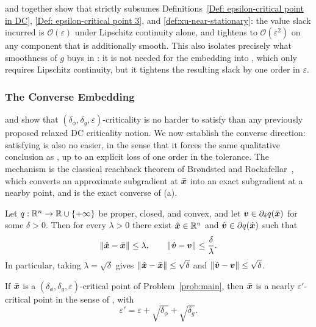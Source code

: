  and
 together show that
 strictly subsumes
Definitions~\ref{Def: epsilon-critical point in DC},
\ref{Def: epsilon-critical point 3}, and \ref{def:xu-near-stationary}: the
value slack incurred is $\mathcal O(\varepsilon)$ under Lipschitz
continuity alone, and tightens to $\mathcal O(\varepsilon^2)$ on any
component that is additionally smooth. This also isolates precisely what
smoothness of $g$ buys in \citet{xu2019stochastic}: it is not needed for
the embedding into , which only requires
Lipschitz continuity, but it tightens the resulting slack by one order in
$\varepsilon$.

\subsubsection{The Converse Embedding}

 and 
show that $(\delta_\phi,\delta_g,\varepsilon)$-criticality is no harder to
satisfy than any previously proposed relaxed DC criticality notion. We now
establish the converse direction: satisfying 
is also no easier, in the sense that it forces the same qualitative
conclusion as , up to an explicit loss
of one order in the tolerance. The mechanism is the classical reachback
theorem of Brøndsted and Rockafellar~\citep{brondsted1965subdifferentiability},
which converts an approximate subgradient at $\bar{\bm{x}}$ into an exact
subgradient at a nearby point, and is the exact converse of
(a).

\begin{lemma}
\label{lem:value-to-spatial}
Let $q:\mathbb{R}^n\to\mathbb{R}\cup\{+\infty\}$ be proper, closed, and convex, and let
$\bm{v}\in\partial_\delta q(\bar{\bm{x}})$ for some $\delta>0$. Then for every
$\lambda>0$ there exist $\hat{\bm{x}}\in\mathbb{R}^n$ and $\hat{\bm{v}}\in\partial
q(\hat{\bm{x}})$ such that
\[
    \|\hat{\bm{x}}-\bar{\bm{x}}\|\le\lambda,
    \qquad
    \|\hat{\bm{v}}-\bm{v}\|\le\frac{\delta}{\lambda}.
\]
In particular, taking $\lambda=\sqrt\delta$ gives
$\|\hat{\bm{x}}-\bar{\bm{x}}\|\le\sqrt\delta$ and $\|\hat{\bm{v}}-\bm{v}\|\le\sqrt\delta$.
\end{lemma}

\begin{proposition}
\label{prop:reverse-embedding}
If $\bar{\bm{x}}$ is a $(\delta_\phi,\delta_g,\varepsilon)$-critical point of
Problem~\eqref{prob:main}, then $\bar{\bm{x}}$ is a nearly
$\varepsilon'$-critical point in the sense of
, with
\[
    \varepsilon'=\varepsilon+\sqrt{\delta_\phi}+\sqrt{\delta_g}.
\]
\end{proposition}

